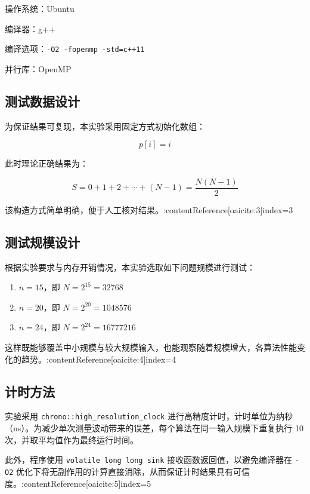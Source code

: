 \documentclass[a4paper,12pt]{ctexart}
\begin{document}
操作系统：Ubuntu

编译器：g++

编译选项：\texttt{-O2 -fopenmp -std=c++11}

并行库：OpenMP

\subsection{测试数据设计}

为保证结果可复现，本实验采用固定方式初始化数组：

\begin{equation}
p[i]=i
\end{equation}

此时理论正确结果为：

\begin{equation}
S=0+1+2+\cdots+(N-1)=\frac{N(N-1)}{2}
\end{equation}

该构造方式简单明确，便于人工核对结果。:contentReference[oaicite:3]{index=3}

\subsection{测试规模设计}

根据实验要求与内存开销情况，本实验选取如下问题规模进行测试：

\begin{enumerate}
  \item $n=15$，即 $N=2^{15}=32768$
  \item $n=20$，即 $N=2^{20}=1048576$
  \item $n=24$，即 $N=2^{24}=16777216$
\end{enumerate}

这样既能够覆盖中小规模与较大规模输入，也能观察随着规模增大，各算法性能变化的趋势。:contentReference[oaicite:4]{index=4}

\subsection{计时方法}

实验采用 \texttt{chrono::high\_resolution\_clock} 进行高精度计时，计时单位为纳秒（ns）。为减少单次测量波动带来的误差，每个算法在同一输入规模下重复执行 10 次，并取平均值作为最终运行时间。

此外，程序使用 \texttt{volatile long long sink} 接收函数返回值，以避免编译器在 \texttt{-O2} 优化下将无副作用的计算直接消除，从而保证计时结果具有可信度。:contentReference[oaicite:5]{index=5}
\end{document}
